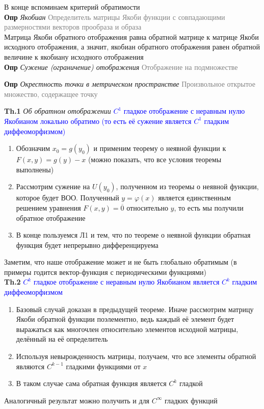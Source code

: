 В конце вспоминаем критерий обратимости \\

\textbf{Опр} \textit{Якобиан}
\textcolor{gray}{Определитель матрицы Якоби функции с совпадающими размерностями векторов прообраза и образа} \\

Матрица Якоби обратного отображения равна обратной матрице к матрице Якоби исходного отображения, а значит, якобиан
обратного отображения равен обратной величине к якобиану исходного отображения \\

\textbf{Опр} \textit{Сужение (ограничение) отображения} \textcolor{gray}{Отображение на подмножестве}

\textbf{Опр} \textit{Окрестность точки в метрическом пространстве} \textcolor{gray}{Произвольное открытое множество,
    содержащее точку}

\textbf{Th.1} \textit{Об обратном отображении} \textcolor{blue}{$C^1$ гладкое отображение с неравным нулю Якобианом
локально обратимо (то есть её сужение является $C^1$ гладким диффеоморфизмом)}

\begin{enumerate}
    \item Обозначим $x_0 = g(y_0)$ и применим теорему о неявной функции к $F (x, y) = g(y) - x$ (можно показать, что
    все условия теоремы выполнены)
    \item Рассмотрим сужение на $U(y_0)$, полученном из теоремы о неявной функции, которое будет ВОО.
    Полученный $y = \varphi (x)$ является единственным решением уравнения $F (x, y) = \overline{0}$ относительно $y$, то есть мы получили обратное отображение
    \item В конце пользуемся Л1 и тем, что по теореме о неявной функции обратная функция будет непрерывно
    дифференцируема
\end{enumerate}

Заметим, что наше отображение может и не быть глобально обратимым (в примеры годится вектор-функция с периодическими
функциями) \\

\textbf{Th.2} \textcolor{blue}{$C^k$ гладкое отображение с неравным нулю Якобианом
является $C^k$ гладким диффеоморфизмом}

\begin{enumerate}
    \item Базовый случай доказан в предыдущей теореме.
    Иначе рассмотрим матрицу Якоби обратной функции поэлементно, ведь каждый её элемент будет выражаться как многочлен
    относительно элементов исходной матрицы, делённый на её определитель
    \item Используя невырожденность матрицы, получаем, что все элементы обратной являются $C^{k-1}$ гладкими
    функциями от $x$
    \item В таком случае сама обратная функция является $C^k$ гладкой
\end{enumerate}
Аналогичный результат можно получить и для $C^{\infty}$ гладких функций


